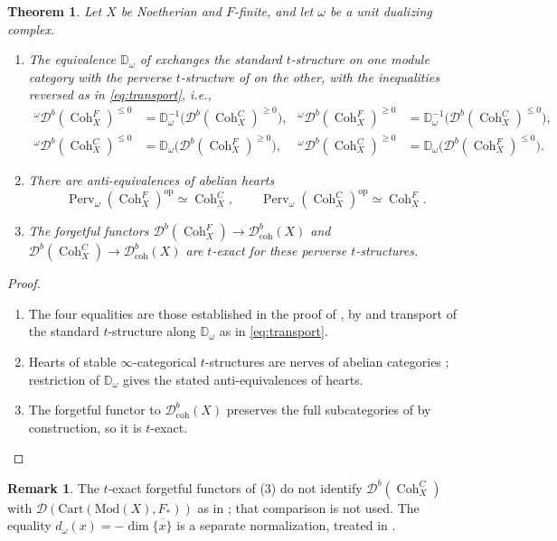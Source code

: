 \documentclass[11pt]{amsart}
\newcommand{\op}{{\operatorname{op}}}
\newcommand{\Coh}{\operatorname{{Coh}}}
\newcommand{\Db}{\mathcal D^b}
\newcommand{\Perv}{\operatorname{Perv}}
\theoremstyle{plain}
\newtheorem{theorem}[theorem]{Theorem}
\theoremstyle{definition}
\newtheorem{remark}[remark]{Remark}
\numberwithin{equation}{section}
\begin{document}
\begin{theorem}\label{thm:perverse}
Let $X$ be Noetherian and $F$-finite, and let $\omega$ be a unit dualizing complex.
\begin{enumerate}
\item
The equivalence $\mathbb D_\omega$ of  exchanges the standard $t$-structure on one module category with the perverse $t$-structure of  on the other, with the inequalities reversed as in \eqref{eq:transport}, i.e.,
\[
 \begin{aligned}
 {}^{\omega}\Db(\Coh^F_X)^{\leq0}
 &=\mathbb D_\omega^{-1}\bigl(\Db(\Coh^C_X)^{\geq0}\bigr),
 &
 {}^{\omega}\Db(\Coh^F_X)^{\geq0}
 &=\mathbb D_\omega^{-1}\bigl(\Db(\Coh^C_X)^{\leq0}\bigr),
 \\
 {}^{\omega}\Db(\Coh^C_X)^{\leq0}
 &=\mathbb D_\omega\bigl(\Db(\Coh^F_X)^{\geq0}\bigr),
 &
 {}^{\omega}\Db(\Coh^C_X)^{\geq0}
 &=\mathbb D_\omega\bigl(\Db(\Coh^F_X)^{\leq0}\bigr).
 \end{aligned}
\]
\item
There are anti-equivalences of abelian hearts
\[
 \Perv_\omega(\Coh^F_X)^{\op}\simeq\Coh^C_X,
 \qquad
 \Perv_\omega(\Coh^C_X)^{\op}\simeq\Coh^F_X.
\]
\item
The forgetful functors $\Db(\Coh^F_X)\to\mathcal D^b_{\mathrm{coh}}(X)$ and $\Db(\Coh^C_X)\to\mathcal D^b_{\mathrm{coh}}(X)$ are $t$-exact for these perverse $t$-structures.
\end{enumerate}
\end{theorem}
\begin{proof}
\begin{enumerate}
\item
The four equalities are those established in the proof of , by  and transport of the standard $t$-structure along $\mathbb D_\omega$ as in \eqref{eq:transport}.
\item
Hearts of stable $\infty$-categorical $t$-structures are nerves of abelian categories \cite[Remark 1.2.1.12]{HA}; restriction of $\mathbb D_\omega$ gives the stated anti-equivalences of hearts.
\item
The forgetful functor to $\mathcal D^b_{\mathrm{coh}}(X)$ preserves the full subcategories of  by construction, so it is $t$-exact.
\end{enumerate}
\end{proof}

\begin{remark}\label{rem:perverse-aside}
The $t$-exact forgetful functors of (3) do not identify $\Db(\Coh^C_X)$ with $\mathcal D(\mathrm{Cart}(\mathrm{Mod}(X),F_*))$ as in \cite[Theorem 6.9]{MWC}; that comparison is not used.
The equality $d_\omega(x)=-\dim\overline{\{x\}}$ is a separate normalization, treated in .
\end{remark}
\end{document}

